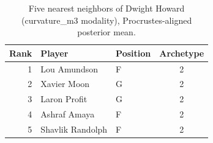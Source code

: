\begin{table}[htbp]
  \centering\small
  \begin{tabular}{rllc}
    \toprule
    Rank & Player & Position & Archetype \\
    \midrule
    1 & Lou Amundson & F & 2 \\
    2 & Xavier Moon & G & 2 \\
    3 & Laron Profit & G & 2 \\
    4 & Ashraf Amaya & F & 2 \\
    5 & Shavlik Randolph & F & 2 \\
    \bottomrule
  \end{tabular}
  \caption{Five nearest neighbors of Dwight Howard (curvature_m3 modality), Procrustes-aligned posterior mean.}
  \label{tab:Dwight_Howard_neighbors_curvature_m3}
\end{table}

